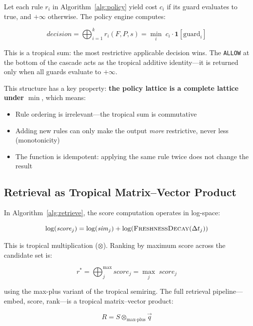 \documentclass[11pt,twocolumn]{article}
\begin{document}
Let each rule $r_i$ in Algorithm~\ref{alg:policy} yield cost $c_i$ if its guard evaluates to true, and $+\infty$ otherwise. The policy engine computes:

\begin{equation}
\mathit{decision} = \bigoplus_{i=1}^{k} r_i(F, P, s) = \min_{i} \; c_i \cdot \mathbf{1}[\text{guard}_i]
\end{equation}

This is a tropical sum: the most restrictive applicable decision wins. The \texttt{ALLOW} at the bottom of the cascade acts as the tropical additive identity---it is returned only when all guards evaluate to $+\infty$.

This structure has a key property: \textbf{the policy lattice is a complete lattice under $\min$}, which means:
\begin{itemize}[nosep,leftmargin=1.2em]
  \item Rule ordering is irrelevant---the tropical sum is commutative
  \item Adding new rules can only make the output \emph{more} restrictive, never less (monotonicity)
  \item The function is idempotent: applying the same rule twice does not change the result
\end{itemize}

\subsection{Retrieval as Tropical Matrix--Vector Product}

In Algorithm~\ref{alg:retrieve}, the score computation operates in log-space:

\begin{equation}
\log(\mathit{score}_j) = \log(\mathit{sim}_j) + \log(\textsc{FreshnessDecay}(\Delta t_j))
\end{equation}

This is tropical multiplication ($\otimes$). Ranking by maximum score across the candidate set is:

\begin{equation}
r^{*} = \bigoplus_{j}^{\max} \mathit{score}_j = \max_{j} \; \mathit{score}_j
\end{equation}

using the max-plus variant of the tropical semiring. The full retrieval pipeline---embed, score, rank---is a tropical matrix--vector product:

\begin{equation}
R = S \otimes_{\max\text{-plus}} \vec{q}
\end{equation}
\end{document}
